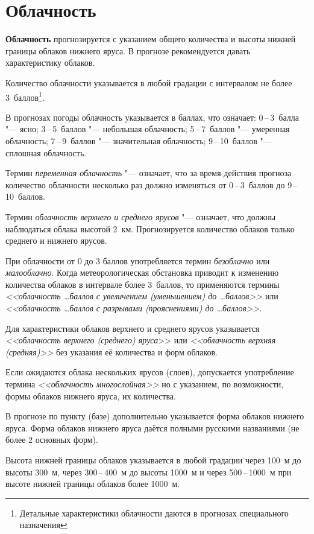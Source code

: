 \documentclass[a4paper, 12pt, twoside, final, book, russian, fittopage, cyremdash, openright]{ncc}
\newcommand{\otdo}{\,--\,}
\begin{document}
\section{Облачность}
\label{sec:clouds_p}

\textbf{Облачность} прогнозируется с указанием общего количества и
высоты нижней границы облаков нижнего яруса. В прогнозе рекомендуется
давать характеристику облаков.

Количество облачности указывается в любой градации с интервалом не
более 3~баллов\footnote{Детальные характеристики облачности даются в
  прогнозах специального назначения}.

В прогнозах погоды облачность указывается в баллах, что означает:
0\otdo3~балла "--- ясно; 3\otdo5~баллов "--- небольшая облачность;
5\otdo7~баллов "--- умеренная облачность; 7\otdo9~баллов "---
значительная облачность; 9\otdo10~баллов "--- сплошная облачность.

Термин \textit{переменная облачность} "--- означает, что за время
действия прогноза количество облачности несколько раз должно
изменяться от 0\otdo3~баллов до 9\otdo10~баллов.

Термин \textit{облачность верхнего и среднего ярусов} "--- означает,
что должны наблюдаться облака высотой 2~км. Прогнозируется количество
облаков только среднего и нижнего ярусов.

При облачности от 0 до 3 баллов употребляется термин
\textit{безоблачно} или \textit{малооблачно}. Когда метеорологическая
обстановка приводит к изменению количества облаков в интервале более
3~баллов, то применяются термины \textit{<<облачность \ldots баллов с увеличением
(уменьшением) до \ldots баллов>>} или \textit{<<облачность \ldots баллов с разрывами
(прояснениями) до \ldots баллов>>}.

Для характеристики облаков верхнего и среднего ярусов указывается
\textit{<<облачность верхнего (среднего) яруса}>> или
\textit{<<облачность верхняя (средняя)>>} без указания её количества и
форм облаков.

Если ожидаются облака нескольких ярусов (слоев), допускается
употребление термина \textit{<<облачность многослойная>>} но с
указанием, по возможности, формы облаков нижнего яруса, их количества.

В прогнозе по пункту (базе) дополнительно указывается форма облаков
нижнего яруса. Форма облаков нижнего яруса даётся полными русскими
названиями (не более 2 основных форм).

Высота нижней границы облаков указывается в любой градации через 100~м
до высоты 300~м, через 300\otdo400~м до высоты 1000~м и через 500\otdo1000~м
при высоте нижней границы облаков более 1000~м.
\end{document}
